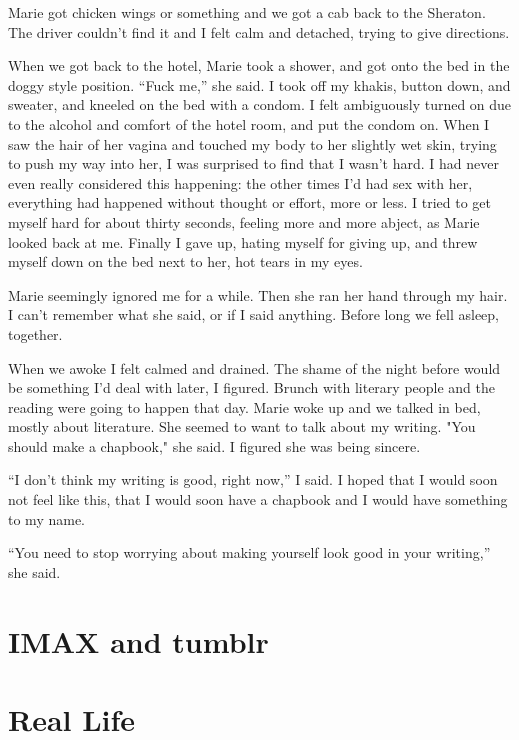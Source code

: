 \documentclass[12pt]{article}
\begin{document}
Marie got chicken wings or something and we got a cab back to the Sheraton.  The
driver couldn't find it and I felt calm and detached, trying to give directions.  

When we got back to the hotel, Marie took a shower, and got onto the bed in the
doggy style position.  ``Fuck me,'' she said.  I took off my khakis, button
down, and sweater, and kneeled on the bed with a condom.  I felt ambiguously
turned on due to the alcohol and comfort of the hotel room, and put the condom
on.  When I saw the hair of her vagina and touched my body to her slightly wet
skin, trying to push my way into her, I was surprised to find that I wasn't
hard.  I had never even really considered this happening: the other times I'd
had sex with her, everything had happened without thought or effort, more or
less.  I tried to get myself hard for about thirty seconds, feeling more and
more abject, as Marie looked back at me.  Finally I gave up, hating myself for
giving up, and threw myself down on the bed next to her, hot tears in my eyes.

Marie seemingly ignored me for a while. Then she ran her hand through my hair.
I can't remember what she said, or if I said anything.  Before long we fell
asleep, together.

When we awoke I felt calmed and drained.  The shame of the night before would be
something I'd deal with later, I figured.  Brunch with literary people and the
reading were going to happen that day.  Marie woke up and we talked in bed,
mostly about literature.  She seemed to want to talk about my writing.  "You
should make a chapbook," she said.  I figured she was being sincere.  

``I don't think my writing is good, right now,'' I said.  I hoped that I would
soon not feel like this, that I would soon have a chapbook and I would have
something to my name.

``You need to stop worrying about making yourself look good in your writing,'' she
said.

\section{IMAX and tumblr} 


\section{Real Life} 
\end{document}
